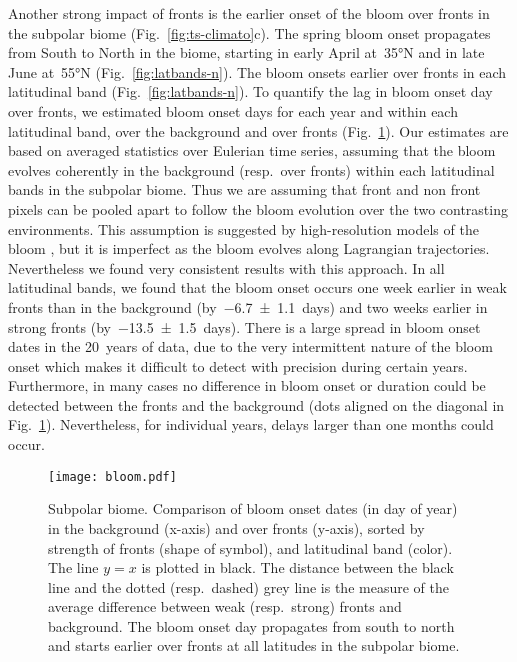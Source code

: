Another strong impact of fronts is the earlier onset of the bloom over fronts in the subpolar biome (Fig.~\ref{fig:ts-climato}c).
The spring bloom onset propagates from South to North in the biome, starting in early April at~\ang{35}N and in late June at~\ang{55}N (Fig.~\ref{fig:latbands-n}).
The bloom onsets earlier over fronts in each latitudinal band (Fig.~\ref{fig:latbands-n}).
To quantify the lag in bloom onset day over fronts, we estimated bloom onset days for each year and within each latitudinal band, over the background and over fronts (Fig.~\ref{fig:bloom}).
Our estimates are based on averaged statistics over Eulerian time series, assuming that the bloom evolves coherently in the background (resp.\ over fronts) within each latitudinal bands in the subpolar biome.
Thus we are assuming that front and non front pixels can be pooled apart to follow the bloom evolution over the two contrasting environments.
This assumption is suggested by high-resolution models of the bloom \parencite[e.g.][]{levy_2005a, karleskind_2011}, but it is imperfect as the bloom evolves along Lagrangian trajectories.
Nevertheless we found very consistent results with this approach.
In all latitudinal bands, we found that the bloom onset occurs one week earlier in weak fronts than in the background (by~\num{-6.7 \pm 1.1}~days) and two weeks earlier in strong fronts (by~\num{-13.5 \pm 1.5}~days).
There is a large spread in bloom onset dates in the 20~years of data, due to the very intermittent nature of the bloom onset \parencite{keerthi_2021} which makes it difficult to detect with precision during certain years.
Furthermore, in many cases no difference in bloom onset or duration could be detected between the fronts and the background (dots aligned on the diagonal in Fig.~\ref{fig:bloom}).
Nevertheless, for individual years, delays larger than one months could occur.

\begin{figure}
  \texttt{[image: bloom.pdf]}
  \caption{
    Subpolar biome. Comparison of bloom onset dates (in day of year) in the background (x-axis) and over fronts (y-axis), sorted by strength of fronts (shape of symbol), and latitudinal band (color).
    The line \(y=x\) is plotted in black.
    The distance between the black line and the dotted (resp.\ dashed) grey line is the measure of the average difference between weak (resp.\ strong) fronts and background.
    The bloom onset day propagates from south to north and starts earlier over fronts at all latitudes in the subpolar biome.
  }%
  \label{fig:bloom}
\end{figure}


